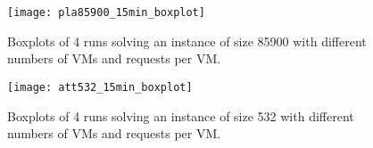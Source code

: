 \begin{figure}[htpb]
    \centering
    \begin{minipage}{.48\textwidth}
        \centering
        \texttt{[image: pla85900\_15min\_boxplot]}
        \caption{Boxplots of 4 runs solving an instance of size 85900 with
                 different numbers of VMs and requests per VM.}
        \label{fig:85900boxplot}
    \end{minipage}%
    \hfill
    \begin{minipage}{.48\textwidth}
        \centering
        \texttt{[image: att532\_15min\_boxplot]}
        \caption{Boxplots of 4 runs solving an instance of size 532 with
                 different numbers of VMs and requests per VM.}
        \label{fig:532boxplot}
    \end{minipage}%
    \label{fig:boxplots}
\end{figure}
